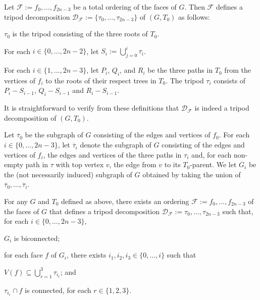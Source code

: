 \documentclass{patmorin}
\begin{document}
Let $\mathcal{F}:=f_0,\ldots,f_{2n-3}$ be a total ordering of the faces of $G$.  Then $\mathcal{F}$ defines a tripod decomposition $\mathcal{D}_\mathcal{F}:=\{\tau_0,\ldots,\tau_{2n-3}\}$ of $(G,T_0)$ as follows:
\begin{compactenum}
  \item $\tau_0$ is the tripod consisting of the three roots of $T_0$.
  \item For each $i\in\{0,\ldots,2n-2\}$, let $S_i:=\bigcup_{j=0}^i \tau_i$.
  \item For each $i\in\{1,\ldots,2n-3\}$, let $P_i$, $Q_i$, and $R_i$ be the three paths in $T_0$ from the vertices of $f_i$ to the roots of their respect trees in $T_0$.  The tripod $\tau_i$ consists of $P_i-S_{i-1}$, $Q_i-S_{i-1}$ and $R_i-S_{i-1}$.
\end{compactenum}
It is straightforward to verify from these definitions that $\mathcal{D}_\mathcal{F}$ is indeed a tripod decomposition of $(G,T_0)$.

Let $\overline{\tau}_0$ be the subgraph of $G$ consisting of the edges and vertices of $f_0$.  For each $i\in\{0,\ldots,2n-3\}$, let $\overline{\tau}_i$ denote the subgraph of $G$ consisting of the edges and vertices of $f_i$, the edges and vertices of the three paths in $\tau_i$ and, for each non-empty path in $\tau$ with top vertex $v$, the edge from $v$ to its $T_0$-parent.  We let $G_i$ be the (not necessarily induced) subgraph of $G$ obtained by taking the union of $\overline{\tau}_0,\ldots,\overline{\tau}_i$.

\begin{lem}\label{face_trick}
  For any $G$ and $T_0$ defined as above, there exists an ordering $\mathcal{F}:=f_0,\ldots,f_{2n-3}$ of the faces of $G$ that defines a tripod decomposition $\mathcal{D}_\mathcal{F}:=\tau_0,\ldots,\tau_{2n-3}$ such that, for each $i\in\{0,\ldots,2n-3\}$,
  \begin{compactenum}[(i)]
    \item $G_i$ is biconnected;
    \item \label{three_faces} for each face $f$ of $G_i$, there exists $i_1,i_2,i_3\in\{0,\ldots,i\}$ such that
    \begin{compactenum}[(a)]
      \item $V(f)\subseteq \bigcup_{r=1}^3 \tau_{i_r}$; and
      \item $\tau_{i_r}\cap f$ is connected, for each $r\in\{1,2,3\}$.
    \end{compactenum}
  \end{compactenum}
\end{lem}
\end{document}
